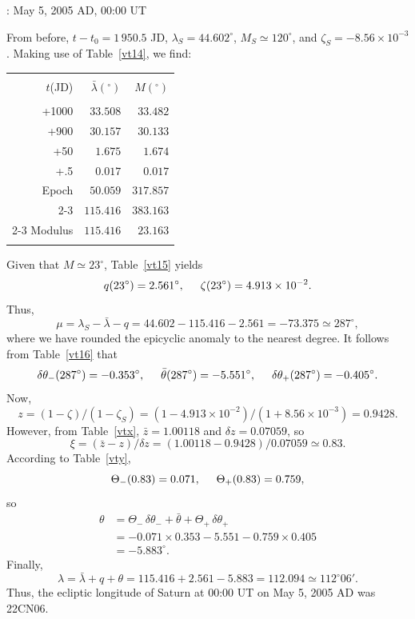 \begin{center}
: May 5,  2005 AD, 00:00 UT
\end{center}
From before, $t-t_0=1\,950.5$ JD, $\lambda_S= 44.602^\circ$, $M_S\simeq 120^\circ$, and
$\zeta_S= -8.56\times 10^{-3}$. Making use of
Table~\ref{vt14}, we find:
\begin{center}
\begin{tabular}{rrr}
&&\\
$t$(JD) & $ \bar{\lambda}(^\circ)$ & $M(^\circ)$\\[-2ex]
&&\\
+1000 & $33.508$ & $33.482$\\
+900 & $30.157$ & $30.133$\\
+50 & $1.675$ & $1.674$\\
+.5 & $0.017$ & $0.017$\\
Epoch & $50.059$ & $317.857$\\\cline{2-3}
&$115.416$ & $383.163$\\\cline{2-3}
Modulus & $115.416$ & $23.163$\\ 
&&\\
\end{tabular}
\end{center}
Given that $M\simeq 23^\circ$, Table~\ref{vt15} yields 
$$
q(23^\circ)= 2.561^\circ,\mbox{\hspace{0.5cm}}\zeta(23^\circ)=4.913\times 10^{-2}.
$$
Thus, 
$$
\mu=\lambda_S - \bar{\lambda}-q = 44.602-115.416 -2.561= -73.375\simeq
287^\circ,
$$
where we have rounded the epicyclic anomaly to the nearest degree. It follows from Table~\ref{vt16}
that 
$$
\delta\theta_-(287^\circ) = -0.353^\circ,\mbox{\hspace{0.5cm}}\bar{\theta}(287^\circ)=-5.551^\circ, \mbox{\hspace{0.5cm}}\delta\theta_+(287^\circ) = -0.405^\circ.
$$
Now,
$$ 
z= (1-\zeta)/(1-\zeta_S) = (1-4.913\times 10^{-2})/(1+8.56\times 10^{-3}) =
0.9428.
$$
However, from Table~\ref{vtx}, $\bar{z}= 1.00118$ and $\delta z = 0.07059$,
so
$$
\xi = (\bar{z}-z)/\delta z = (1.00118-0.9428)/0.07059 \simeq 0.83.
$$
According to Table~\ref{vty}, 
$$
\Theta_-(0.83) = 0.071, \mbox{\hspace{0.5cm}}\Theta_+(0.83) = 0.759,
$$
so
\begin{align*}
\theta  &= \Theta_-\,\delta\theta_- + \bar{\theta}+\Theta_+\,\delta\theta_+\\[0.5ex]
& = -0.071\times 0.353-5.551-0.759\times 0.405\\[0.5ex]
& =- 5.883^\circ.
\end{align*}
Finally,
$$
\lambda=\bar{\lambda} + q + \theta= 115.416+2.561-5.883=112.094 \simeq 112^\circ 06'.
$$
Thus,
the ecliptic longitude of Saturn at 00:00 UT on May 5, 2005 AD was 22CN06.

